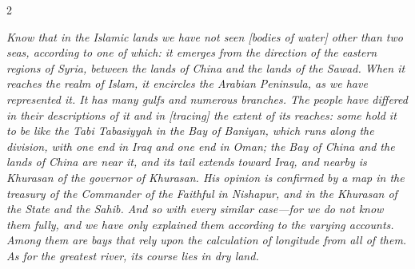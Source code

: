\documentclass[11pt,a4paper]{article}
\begin{document}
\begin{paracol}{2}

\switchcolumn[0]
\begin{flushright}
{\small\arabicfont
{}}
\end{flushright}

\switchcolumn[1]
\begin{flushleft}
\small
\textit{Know that in the Islamic lands we have not seen [bodies of water] other than two seas, according to one of which: it emerges from the direction of the eastern regions of Syria, between the lands of China and the lands of the Sawad. When it reaches the realm of Islam, it encircles the Arabian Peninsula, as we have represented it. It has many gulfs and numerous branches. The people have differed in their descriptions of it and in [tracing] the extent of its reaches: some hold it to be like the Tabi Tabasiyyah in the Bay of Baniyan, which runs along the division, with one end in Iraq and one end in Oman; the Bay of China and the lands of China are near it, and its tail extends toward Iraq, and nearby is Khurasan of the governor of Khurasan. His opinion is confirmed by a map in the treasury of the Commander of the Faithful in Nishapur, and in the Khurasan of the State and the Sahib. And so with every similar case---for we do not know them fully, and we have only explained them according to the varying accounts. Among them are bays that rely upon the calculation of longitude from all of them. As for the greatest river, its course lies in dry land.}
\end{flushleft}

\end{paracol}
\end{document}
